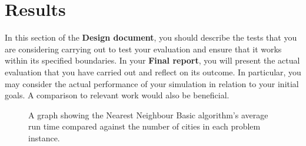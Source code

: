 \documentclass[conference,backref=page]{acmsiggraph}
\begin{document}
\section{Results}
In this section of the {\bf Design document}, you should describe the tests that you are considering carrying out to test your evaluation and ensure that it works within its specified boundaries. In your {\bf Final report}, you will present the actual evaluation that you have carried out and reflect on its outcome. In particular, you may consider the actual performance of your simulation in relation to your initial goals. A comparison to relevant work would also be beneficial.

\begin{figure}[h]
	\begin{center}
	\end{center}
	\caption{A graph showing the Nearest Neighbour Basic algorithm's average run time compared against the number of cities in each problem instance.}
	\label{avgresultstable}
\end{figure}
\end{document}
